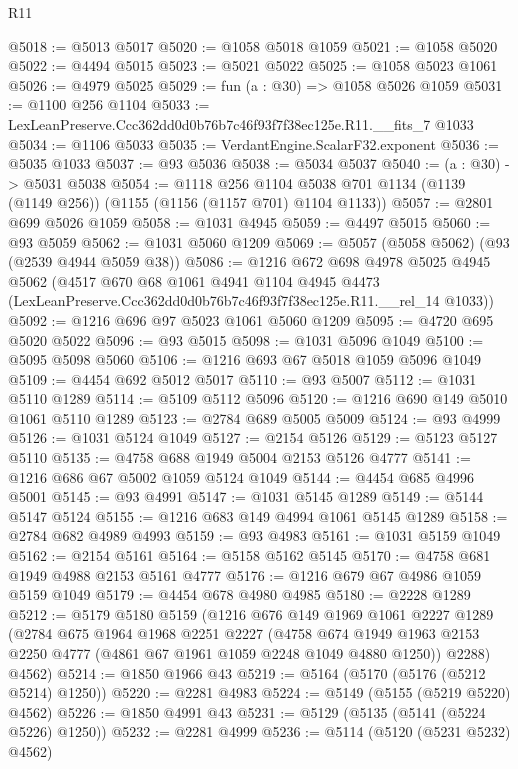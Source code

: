 \begin{lexlean}{R11}
\begin{coremodule}
@5018 := @5013 @5017
@5020 := @1058 @5018 @1059
@5021 := @1058 @5020
@5022 := @4494 @5015
@5023 := @5021 @5022
@5025 := @1058 @5023 @1061
@5026 := @4979 @5025
@5029 := fun (a : @30) => @1058 @5026 @1059
@5031 := @1100 @256 @1104
@5033 := LexLeanPreserve.Ccc362dd0d0b76b7c46f93f7f38ec125e.R11.__fits_7 @1033
@5034 := @1106 @5033
@5035 := VerdantEngine.ScalarF32.exponent
@5036 := @5035 @1033
@5037 := @93 @5036
@5038 := @5034 @5037
@5040 := (a : @30) -> @5031 @5038
@5054 := @1118
    @256
    @1104
    @5038
    @701
    @1134
    (@1139 (@1149 @256))
    (@1155 (@1156 (@1157 @701) @1104 @1133))
@5057 := @2801 @699 @5026 @1059
@5058 := @1031 @4945
@5059 := @4497 @5015
@5060 := @93 @5059
@5062 := @1031 @5060 @1209
@5069 := @5057 (@5058 @5062) (@93 (@2539 @4944 @5059 @38))
@5086 := @1216
    @672
    @698
    @4978
    @5025
    @4945
    @5062
    (@4517
      @670
      @68
      @1061
      @4941
      @1104
      @4945
      @4473
      (LexLeanPreserve.Ccc362dd0d0b76b7c46f93f7f38ec125e.R11.__rel_14 @1033))
@5092 := @1216 @696 @97 @5023 @1061 @5060 @1209
@5095 := @4720 @695 @5020 @5022
@5096 := @93 @5015
@5098 := @1031 @5096 @1049
@5100 := @5095 @5098 @5060
@5106 := @1216 @693 @67 @5018 @1059 @5096 @1049
@5109 := @4454 @692 @5012 @5017
@5110 := @93 @5007
@5112 := @1031 @5110 @1289
@5114 := @5109 @5112 @5096
@5120 := @1216 @690 @149 @5010 @1061 @5110 @1289
@5123 := @2784 @689 @5005 @5009
@5124 := @93 @4999
@5126 := @1031 @5124 @1049
@5127 := @2154 @5126
@5129 := @5123 @5127 @5110
@5135 := @4758 @688 @1949 @5004 @2153 @5126 @4777
@5141 := @1216 @686 @67 @5002 @1059 @5124 @1049
@5144 := @4454 @685 @4996 @5001
@5145 := @93 @4991
@5147 := @1031 @5145 @1289
@5149 := @5144 @5147 @5124
@5155 := @1216 @683 @149 @4994 @1061 @5145 @1289
@5158 := @2784 @682 @4989 @4993
@5159 := @93 @4983
@5161 := @1031 @5159 @1049
@5162 := @2154 @5161
@5164 := @5158 @5162 @5145
@5170 := @4758 @681 @1949 @4988 @2153 @5161 @4777
@5176 := @1216 @679 @67 @4986 @1059 @5159 @1049
@5179 := @4454 @678 @4980 @4985
@5180 := @2228 @1289
@5212 := @5179
    @5180
    @5159
    (@1216
      @676
      @149
      @1969
      @1061
      @2227
      @1289
      (@2784
        @675
        @1964
        @1968
        @2251
        @2227
        (@4758 @674 @1949 @1963 @2153 @2250 @4777 (@4861 @67 @1961 @1059 @2248 @1049 @4880 @1250))
        @2288)
      @4562)
@5214 := @1850 @1966 @43
@5219 := @5164 (@5170 (@5176 (@5212 @5214) @1250))
@5220 := @2281 @4983
@5224 := @5149 (@5155 (@5219 @5220) @4562)
@5226 := @1850 @4991 @43
@5231 := @5129 (@5135 (@5141 (@5224 @5226) @1250))
@5232 := @2281 @4999
@5236 := @5114 (@5120 (@5231 @5232) @4562)

\end{coremodule}
\end{lexlean}
